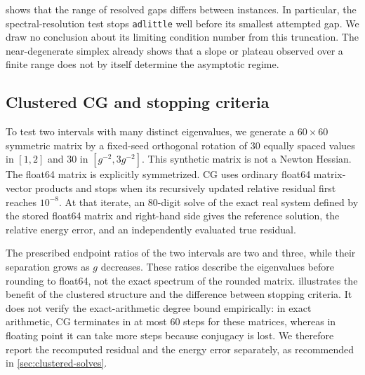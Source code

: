 \begin{table}[tb]
\centering

\caption{Netlib results: accepted points out of 27 decreasing values of
$\mu$, and the gap, condition number $\kappa$ of the reduced
log-barrier Hessian, and Newton decrement $\rho=\rho_F(x;\mu)$ at
the last accepted point. The raw data retain all attempted points,
including rejected ones.}
\label{tab:netlib}
\end{table}

 shows that the range of resolved gaps differs
between instances. In particular, the spectral-resolution test stops
\texttt{adlittle} well before its smallest attempted gap. We draw no
conclusion about its limiting condition number from this truncation.
The near-degenerate simplex already shows that a slope or plateau
observed over a finite range does not by itself determine the
asymptotic regime.

\subsection{Clustered CG and stopping criteria}

To test two intervals with many distinct eigenvalues, we generate a
$60\times60$ symmetric matrix by a fixed-seed orthogonal rotation of
30 equally spaced values in $[1,2]$ and 30 in $[g^{-2},3g^{-2}]$.
This synthetic matrix is not a Newton Hessian. The float64 matrix is
explicitly symmetrized. CG uses ordinary float64 matrix-vector
products and stops when its recursively updated relative residual first
reaches $10^{-8}$. At that iterate, an 80-digit solve of the exact real system defined
by the stored float64 matrix and right-hand side gives the reference
solution, the relative energy error, and an independently evaluated
true residual.

\begin{table}[tb]
\centering

\caption{Float64 CG on the synthetic two-interval matrices. The final
two columns use an 80-digit reference calculation for the rounded
matrix and right-hand side. Passing the recursive stopping test does
not guarantee a true relative residual below $10^{-8}$.}
\label{tab:cg}
\end{table}

The prescribed endpoint ratios of the two intervals are two and
three, while their separation grows as $g$ decreases. These ratios
describe the eigenvalues before rounding to float64, not the exact
spectrum of the rounded matrix.  illustrates the benefit
of the clustered structure and the difference between stopping
criteria. It does not verify the exact-arithmetic degree bound
empirically: in exact arithmetic, CG
terminates in at most 60 steps for these matrices, whereas in floating
point it can take more steps because conjugacy is lost. We therefore
report the recomputed residual and the energy error separately, as
recommended in \cref{sec:clustered-solves}.
